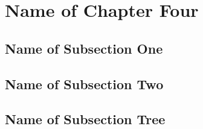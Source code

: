 \section{Name of Chapter Four}

\lipsum[4]

\subsection{Name of Subsection One}

\lipsum

\subsection{Name of Subsection Two}

\lipsum

\subsection{Name of Subsection Tree}

\lipsum
